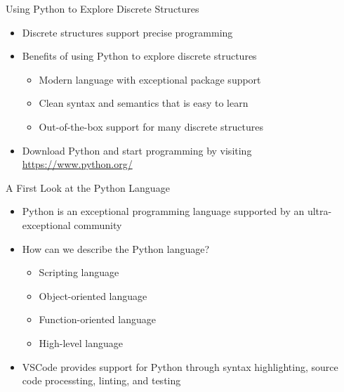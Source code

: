 \documentclass[14pt,aspectratio=169]{beamer}
\begin{document}
%
\begin{frame}{Using Python to Explore Discrete Structures}
  \begin{itemize}
    \item Discrete structures support precise programming
    \item Benefits of using Python to explore discrete structures
      \begin{itemize}
        \item Modern language with exceptional package support
        \item Clean syntax and semantics that is easy to learn
        \item Out-of-the-box support for many discrete structures
      \end{itemize}
    \item Download Python and start programming by visiting
      \url{https://www.python.org/}
  \end{itemize}
\end{frame}

%
\begin{frame}{A First Look at the Python Language}
  \begin{itemize}
    \item Python is an exceptional programming language supported by an
      ultra-exceptional community
      \vspace*{-.15in}
    \item How can we describe the Python language?
      \begin{itemize}
        \item Scripting language
        \item Object-oriented language
        \item Function-oriented language
        \item High-level language
      \end{itemize}
      \vspace*{-.15in}
    \item VSCode provides support for Python through syntax highlighting, source
      code processting, linting, and testing
  \end{itemize}
\end{frame}
\end{document}
